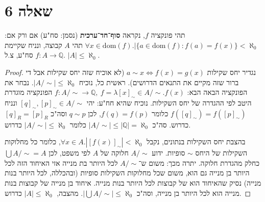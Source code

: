 \documentclass[]{article}
\newcommand\Q     {\mathbb{Q}}
\newcommand\dom   {\text{dom}}
\newcommand\az    {\aleph_0}
\begin{document}
	\section*{שאלה 6}
	תהי פונקציה $ f $, נקראה \textbf{סוף־חד־ערכית} (נסמן: סח"ע) אם ורק אם: 
	$ \forall x \in \dom(f). |\{a \in \dom(f) \colon f(a) = f(x)\} < \az $
	תהי $ A $ קבוצה, ונניח שקיימת $ f \colon A \to \Q $ סח"ע, צ.ל. $ |A| \le \az $. 
	\begin{proof}
		נגדיר יחס שקילות $ a \sim x \iff f(x) = g(x) $ (לא אוכיח שזה יחס שקילות אבל די ברור שזה מקיים את התנאים הדרושים). ראשית כל, נוכיח $ |A / \sim | \le \az $. נבחר את הפונקציה הבאה הבא: 
		$ f \colon A / \sim \to \Q, \ f = \lambda [x]_\sim \in A / \sim. f(x) $
		הפונקציה מוגדרת היטב לפי ההגדרה של יחס השקילות. נוכיח שהיא חח"ע: יהי $ [q]_\sim, [p]_\sim \in A / \sim $ ונניח $ f([q]_\sim) = f([p]_\sim) $ כלומר $ f(q) = f(p) $, לכן $ q \sim p $ וסה"כ $ [q]_R = [p]_R $ כדרוש. סה"כ $ |A / \sim| \le |\Q| = \az $ כלומר $ |A / \sim| \le \az $ כדרוש. 
		
		בהצבת יחס השקילות בנתונים, נקבל $ \forall x \in A.|[f(x)]_\sim| < \az $, כלומר כל מחלוקות השקילות של היחס $ \sim $ סופיות. ידוע $ A / \sim $ חלוקה של $ A $ לפי משפט, לכן $ \bigcup A / \sim = A $ כחלק מהגדרת חלוקה. יתרה מכך: משום ש־$ A / \sim $ לכל היותר בת מנייה אזי האיחוד הזה לכל היותר בן מנייה גם הוא, משום שכל מחלוקות השקילות סופיות (ובהכללה, לכל היותר בנות מנייה) נסיק שהאיחוד הוא של קבוצות לכל היותר בנות מנייה. איחוד בן מנייה של קבוצות בנות מנייה הוא לכל היותר בן מנייה, וסה"כ $ |\bigcup A / \sim| \le \az $. מהצבה, $ |A| \le \az $ כדרוש. 
	\end{proof}
	
\end{document}
